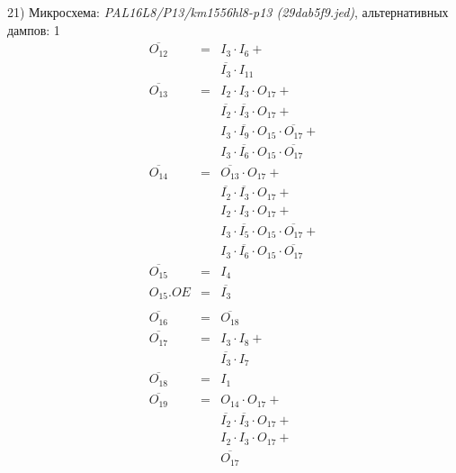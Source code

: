 \documentclass[a4paper,russian]{report}
\begin{document}
21) Микросхема: \emph{PAL16L8/P13/km1556hl8-p13  (29dab5f9.jed)}, альтернативных дампов: 1
\nopagebreak\begin{eqnarray*}
    \overline{O_{12}} & = & I_{3} \cdotp I_{6} + \\
	& &  \overline{I_{3}} \cdotp I_{11} \\
    \overline{O_{13}} & = & I_{2} \cdotp I_{3} \cdotp O_{17} + \\
	& &  \overline{I_{2}} \cdotp \overline{I_{3}} \cdotp O_{17} + \\
	& &  I_{3} \cdotp \overline{I_{9}} \cdotp O_{15} \cdotp \overline{O_{17}} + \\
	& &  I_{3} \cdotp \overline{I_{6}} \cdotp O_{15} \cdotp \overline{O_{17}} \\
    \overline{O_{14}} & = & \overline{O_{13}} \cdotp O_{17} + \\
	& &  \overline{I_{2}} \cdotp \overline{I_{3}} \cdotp O_{17} + \\
	& &  I_{2} \cdotp I_{3} \cdotp O_{17} + \\
	& &  I_{3} \cdotp \overline{I_{5}} \cdotp O_{15} \cdotp \overline{O_{17}} + \\
	& &  I_{3} \cdotp \overline{I_{6}} \cdotp O_{15} \cdotp \overline{O_{17}} \\
    \overline{O_{15}} & = & I_{4} \\
    O_{15}.OE & = & \overline{I_{3}} \\ \\
    \overline{O_{16}} & = & \overline{O_{18}} \\
    \overline{O_{17}} & = & I_{3} \cdotp I_{8} + \\
	& &  \overline{I_{3}} \cdotp I_{7} \\
    \overline{O_{18}} & = & I_{1} \\
    \overline{O_{19}} & = & O_{14} \cdotp O_{17} + \\
	& &  \overline{I_{2}} \cdotp \overline{I_{3}} \cdotp O_{17} + \\
	& &  I_{2} \cdotp I_{3} \cdotp O_{17} + \\
	& &  \overline{O_{17}} \\
 \end{eqnarray*}
\pagebreak[1]
\end{document}
